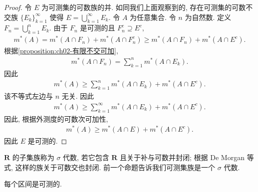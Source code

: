 \documentclass[../../main.tex]{subfiles}
\begin{document}
\begin{proof}
令 $E$ 为可测集的可数族的并. 如同我们上面观察到的, 存在可测集的可数不交族 $\{E_{k}\}_{k=1}^{\infty}$ 使得 $E=\bigcup_{k=1}^{\infty}E_{k}$. 令 $A$ 为任意集合. 令 $n$ 为自然数. 定义 $F_{n}=\bigcup_{k=1}^{n}E_{k}$. 由于 $F_{n}$ 是可测的且 $F_{n}^{c}\supseteq E^{c}$,
\begin{align*}
m^{*}(A)=m^{*}(A\cap F_{n})+m^{*}(A\cap F_{n}^{c})\geqslant m^{*}(A\cap F_{n})+m^{*}(A\cap E^{c}).
\end{align*}
根据\cref{proposition:ch02-有限不交可加},
\begin{align*}
m^{*}(A\cap F_{n})=\sum_{k=1}^{n}m^{*}(A\cap E_{k}).
\end{align*}
因此
\begin{align*}
m^{*}(A)\geqslant\sum_{k=1}^{n}m^{*}(A\cap E_{k})+m^{*}(A\cap E^{c}).
\end{align*}
该不等式左边与 $n$ 无关. 因此
\begin{align*}
m^{*}(A)\geqslant\sum_{k=1}^{\infty}m^{*}(A\cap E_{k})+m^{*}(A\cap E^{c}).
\end{align*}
因此, 根据外测度的可数次可加性,
\begin{align*}
m^{*}(A)\geqslant m^{*}(A\cap E)+m^{*}(A\cap E^{c}).
\end{align*}
因此 $E$ 是可测的.
\end{proof}

$\mathbf{R}$ 的子集族称为 $\sigma$ 代数, 若它包含 $\mathbf{R}$ 且关于补与可数并封闭; 根据 De Morgan 等式, 这样的族关于可数交也封闭. 前一个命题告诉我们可测集族是一个 $\sigma$ 代数.

\begin{proposition}\label{proposition:ch02-区间可测}
每个区间是可测的.
\end{proposition}
\end{document}
